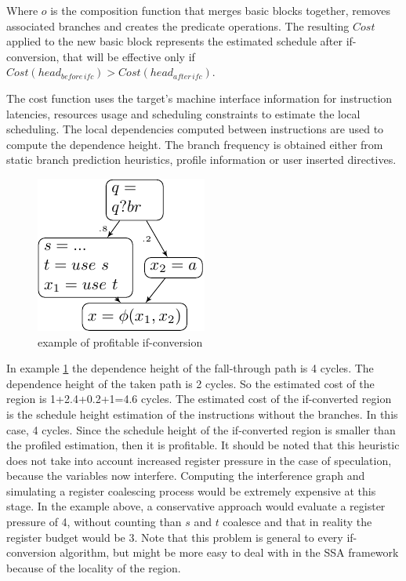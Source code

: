 Where $o$ is the composition function that merges basic blocks together, removes associated branches and creates the predicate operations. The resulting $Cost$ applied to the new basic block represents the estimated schedule after if-conversion, that will be effective only if $Cost(head_{before\,ifc}) > Cost(head_{after\,ifc})$. 
 
The cost function uses the target's machine interface information for instruction latencies, resources usage and scheduling constraints to estimate the local scheduling. The local dependencies computed between instructions are used to compute the dependence height. The branch frequency is obtained either from static branch prediction heuristics, profile information or user inserted directives.
\begin{figure}
    \includegraphics[scale=0.8]{ssa_freq}
\caption{example of profitable if-conversion}
\label{fig:ssa_freq}
\end{figure}

In example \ref{fig:ssa_freq} the dependence height of the fall-through path is 4 cycles. The dependence height of the taken path is 2 cycles. So the estimated cost of the region is 1+2.4+0.2+1=4.6 cycles. The estimated cost of the if-converted region is the schedule height estimation of the instructions without the branches. In this case, 4 cycles. Since the schedule height of the if-converted region is smaller than the profiled estimation, then it is profitable.
It should be noted that this heuristic does not take into account increased register pressure in the case of speculation, because the variables now interfere. Computing the interference graph and simulating a register coalescing process would be extremely expensive at this stage. In the example above, a conservative approach would evaluate a register pressure of 4, without counting than $s$ and $t$ coalesce and that in reality the register budget would be 3. Note that this problem is general to every if-conversion algorithm, but might be more easy to deal with in the SSA framework because of the locality of the region.

